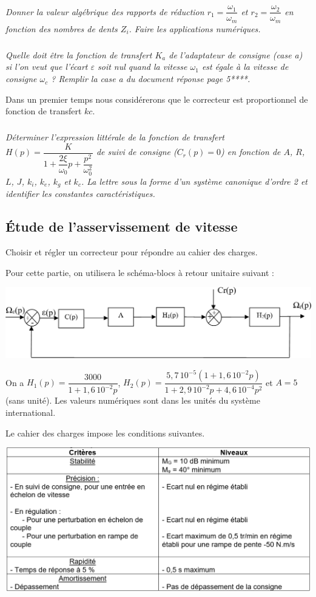 \documentclass[10pt,fleqn]{article} %
\begin{document}
\subparagraph{}
\textit{Donner la valeur algébrique des rapports de réduction $r_1=\dfrac{\omega_1}{\omega_m}$ et $r_2=\dfrac{\omega_2}{\omega_m}$ en fonction des nombres de dents $Z_i$. Faire les applications numériques.}

\subparagraph{}
\textit{Quelle doit être la fonction de transfert $K_a$ de l'adaptateur de consigne (case a) si l'on veut que l’écart $\varepsilon$ soit nul quand la vitesse $\omega_1$ est égale à la vitesse de consigne $\omega_c$ ? Remplir la case a du document réponse page 5****.}


Dans un premier temps nous considérerons que le correcteur est proportionnel de fonction de transfert $kc$.

\subparagraph{}
\textit{Déterminer l'expression littérale de la fonction de transfert  $H(p)=\dfrac{K}{1+\dfrac{2\xi}{\omega_0}p+\dfrac{p^2}{\omega_0^2}}$ de suivi de consigne ($C_r(p) = 0$) en fonction de $A$, $R$, $L$, $J$, $k_i$, $k_e$, $k_g$ et $k_c$. La  lettre sous la forme d'un système canonique d'ordre 2 et identifier les constantes caractéristiques.}

\subsection{Étude de l'asservissement de vitesse}

\begin{obj}
Choisir et régler un correcteur pour répondre au cahier des charges.
\end{obj}

Pour cette partie, on utilisera le schéma-blocs à retour unitaire suivant :
\begin{center}
\includegraphics[width=.8\linewidth]{images/e3a_06.png}
\end{center}

On a $H_1(p)=\dfrac{3000}{1+1,6\, 10^{-2}p}$, $H_2(p)=\dfrac{5,7\, 10^{-5}\left(1+ 1,6\, 10^{-2}p\right)}{1+2,9\, 10^{-2}p+4,6\, 10^{-4}p^2}$ et $A=5$ (sans unité). Les valeurs numériques sont dans les unités du système international.

Le cahier des charges impose les conditions suivantes. 
\begin{center}
\includegraphics[width=.8\linewidth]{images/e3a_07.png}
\end{center}
\end{document}
